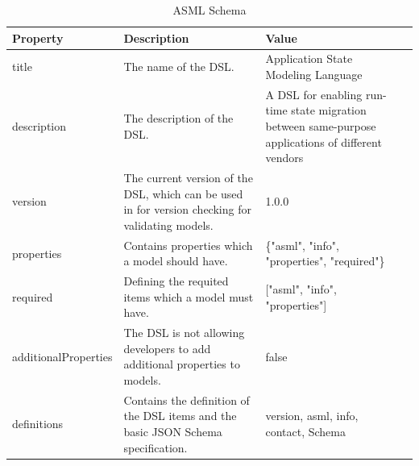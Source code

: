 \begin{table}
\begin{tabularx}{\textwidth}{|l|X|X|r|}
\hline
Property             & Description                                                                              & Value                                                                                                                   \\\hline
title                & The name of the DSL.                                                                     & Application State Modeling Language                                                                                     \\\hline
description          & The description of the DSL.                                                              & A DSL for enabling run-time state migration between same-purpose applications of different vendors \\\hline
version              & The current version of the DSL, which can be used in for version checking for validating models. & 1.0.0                                                                                                                   \\\hline
properties           & Contains properties which a model should have.                                       & \{"asml", "info", "properties", "required"\}                                                                            \\\hline
required             & Defining the requited items which a model must have.                                     & {[}"asml", "info", "properties"{]}                                                                                      \\\hline
additionalProperties & The DSL is not allowing developers to add additional properties to models.               & false                                                                                                                   \\\hline
definitions          & Contains the definition of the DSL items and the basic JSON Schema specification.        & version, asml, info, contact, Schema

\\\hline
\end{tabularx}
\caption{ASML Schema}
\label{tab:asml-schema}
\end{table}





